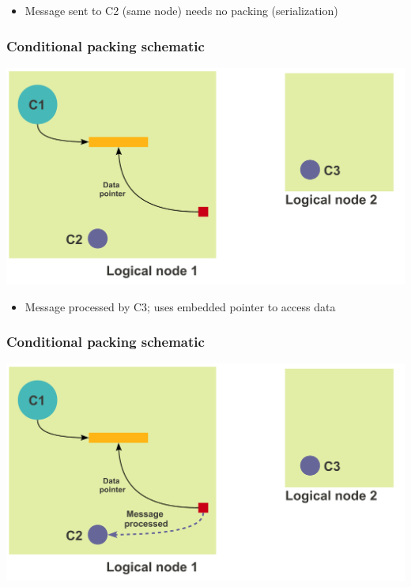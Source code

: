 \begin{frame}[fragile]
  \begin{itemize}
    \item Message sent to C2 (same node) needs no packing (serialization)
  \end{itemize}
  \frametitle{Conditional packing schematic}
  \includegraphics[width=\textwidth]{figures/advancedOpts/fig2_1}
\end{frame}

\begin{frame}[fragile]
  \begin{itemize}
    \item Message processed by C3; uses embedded pointer to access data
  \end{itemize}
  \frametitle{Conditional packing schematic}
  \includegraphics[width=\textwidth]{figures/advancedOpts/fig2_2}
\end{frame}

